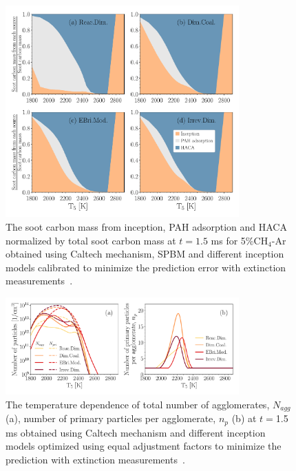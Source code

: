 \begin{figure}[H]
	\centering
	\includegraphics[width=0.8\textwidth]{Figures/Results/Shocktube/Agafonov2016_cpr/C_tot_distmap_5CH4.pdf}
	\caption{The soot carbon mass from inception, PAH adsorption and HACA normalized by total soot carbon mass at $t=1.5$ ms for 5\%$\mathrm{CH_4}$-Ar obtained using Caltech mechanism, SPBM and different inception models calibrated to minimize the prediction error with extinction measurements~\citep{agafonov2016unified}.}
	\label{fig:shockagof_carbon_map_cpr} 
\end{figure}


\begin{figure}[H]
	\centering
	\includegraphics[width=0.8\textwidth]{Figures/Results/Shocktube/Agafonov2016_cpr/N_agg_n_p_5CH4.pdf}
	\caption{The temperature dependence of total number of agglomerates, $N_{agg}$ (a), number of primary particles per agglomerate, $n_p$ (b) at $t=$1.5 ms obtained using Caltech mechanism and different inception models optimized using equal adjustment factors to minimize the prediction with extinction measurements~\citep{agafonov2016unified}.}
	\label{fig:shockagof_Nagg_np_cpr} 
\end{figure}



